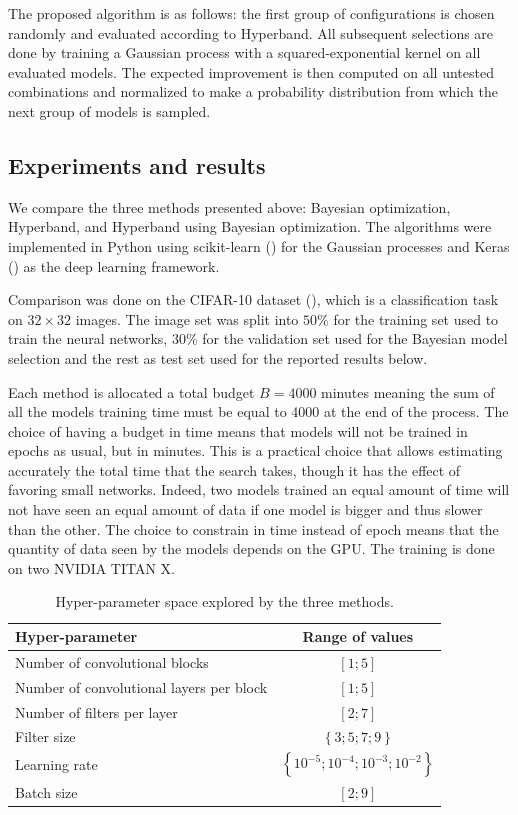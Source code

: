 The proposed algorithm is as follows: the first group of configurations is chosen randomly and evaluated according to Hyperband. All subsequent selections are done by training a Gaussian process with a squared-exponential kernel on all evaluated models. The expected improvement is then computed on all untested combinations and normalized to make a probability distribution from which the next group of models is sampled.

\subsection{Experiments and results}

We compare the three methods presented above: Bayesian optimization, Hyperband, and Hyperband using Bayesian optimization. The algorithms were implemented in Python using scikit-learn (\textcite{pedregosa2011sklearn}) for the Gaussian processes and Keras (\textcite{chollet2015keras}) as the deep learning framework.

Comparison was done on the CIFAR-10 dataset (\textcite{krizhevsky2009}), which is a classification task on $32 \times 32$ images. The image set was split into $50\%$ for the training set used to train the neural networks, $30\%$ for the validation set used for the Bayesian model selection and the rest as test set used for the reported results below. 

Each method is allocated a total budget $B = 4000$ minutes meaning the sum of all the models training time must be equal to 4000 at the end of the process. The choice of having a budget in time means that models will not be trained in epochs as usual, but in minutes. This is a practical choice that allows estimating accurately the total time that the search takes, though it has the effect of favoring small networks. Indeed, two models trained an equal amount of time will not have seen an equal amount of data if one model is bigger and thus slower than the other. The choice to constrain in time instead of epoch means that the quantity of data seen by the models depends on the GPU. The training is done on two NVIDIA TITAN X.

\begin{table}[htbp]
	\centering
	\begin{tabular}{ | l | c | }
		\hline
		Hyper-parameter & Range of values \\ \hline
		Number of convolutional blocks & $\left[ 1; 5\right]$ \\
		Number of convolutional layers per block & $\left[ 1; 5\right]$ \\
		Number of filters per layer & $\left[ 2; 7\right]$ \\
		Filter size & $\left\{ 3; 5; 7; 9 \right\}$ \\
		Learning rate & $\left\{ 10^{-5}; 10^{-4}; 10^{-3}; 10^{-2} \right\}$ \\
		Batch size & $\left[ 2; 9\right]$ \\
		\hline
	\end{tabular}
	\caption{Hyper-parameter space explored by the three methods.}
	\label{table:hyperspace_combine}
\end{table}

